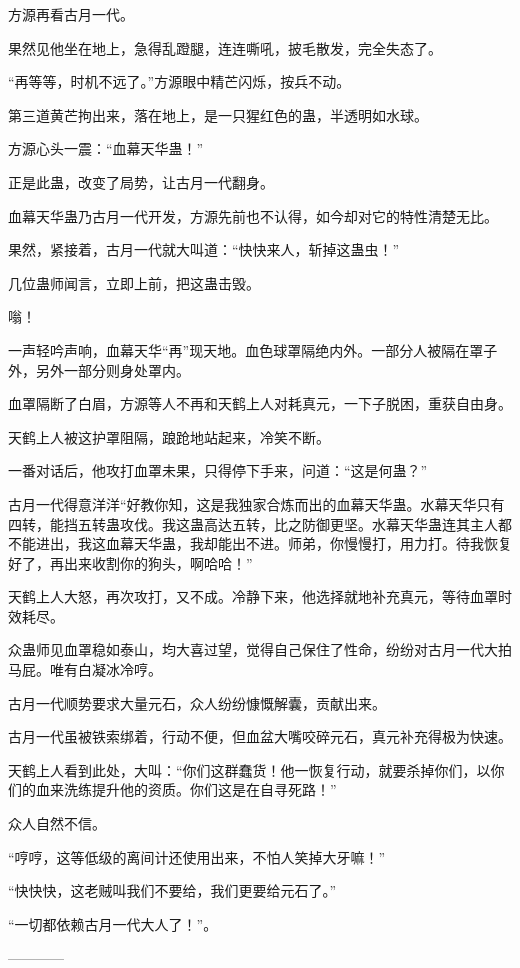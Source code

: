 \begin{this_body}
方源再看古月一代。

果然见他坐在地上，急得乱蹬腿，连连嘶吼，披毛散发，完全失态了。

“再等等，时机不远了。”方源眼中精芒闪烁，按兵不动。

第三道黄芒拘出来，落在地上，是一只猩红色的蛊，半透明如水球。

方源心头一震：“血幕天华蛊！”

正是此蛊，改变了局势，让古月一代翻身。

血幕天华蛊乃古月一代开发，方源先前也不认得，如今却对它的特性清楚无比。

果然，紧接着，古月一代就大叫道：“快快来人，斩掉这蛊虫！”

几位蛊师闻言，立即上前，把这蛊击毁。

嗡！

一声轻吟声响，血幕天华“再”现天地。血色球罩隔绝内外。一部分人被隔在罩子外，另外一部分则身处罩内。

血罩隔断了白眉，方源等人不再和天鹤上人对耗真元，一下子脱困，重获自由身。

天鹤上人被这护罩阻隔，踉跄地站起来，冷笑不断。

一番对话后，他攻打血罩未果，只得停下手来，问道：“这是何蛊？”

古月一代得意洋洋“好教你知，这是我独家合炼而出的血幕天华蛊。水幕天华只有四转，能挡五转蛊攻伐。我这蛊高达五转，比之防御更坚。水幕天华蛊连其主人都不能进出，我这血幕天华蛊，我却能出不进。师弟，你慢慢打，用力打。待我恢复好了，再出来收割你的狗头，啊哈哈！”

天鹤上人大怒，再次攻打，又不成。冷静下来，他选择就地补充真元，等待血罩时效耗尽。

众蛊师见血罩稳如泰山，均大喜过望，觉得自己保住了性命，纷纷对古月一代大拍马屁。唯有白凝冰冷哼。

古月一代顺势要求大量元石，众人纷纷慷慨解囊，贡献出来。

古月一代虽被铁索绑着，行动不便，但血盆大嘴咬碎元石，真元补充得极为快速。

天鹤上人看到此处，大叫：“你们这群蠢货！他一恢复行动，就要杀掉你们，以你们的血来洗练提升他的资质。你们这是在自寻死路！”

众人自然不信。

“哼哼，这等低级的离间计还使用出来，不怕人笑掉大牙嘛！”

“快快快，这老贼叫我们不要给，我们更要给元石了。”

“一切都依赖古月一代大人了！”。

------------

\end{this_body}

